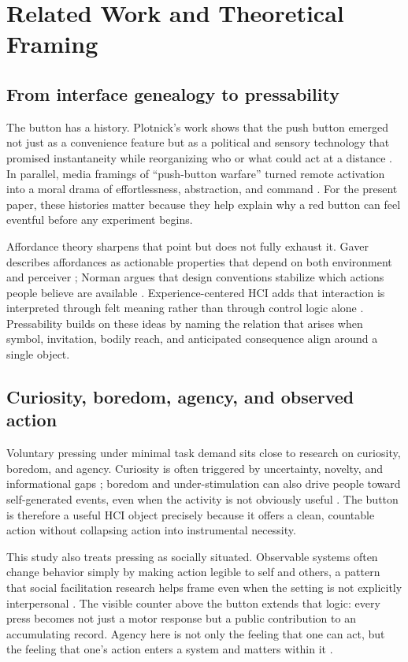 \section{Related Work and Theoretical Framing}

\subsection{From interface genealogy to pressability}

The button has a history. Plotnick's work shows that the push button emerged not just as a convenience feature but as a political and sensory technology that promised instantaneity while reorganizing who or what could act at a distance \citep{Plotnick2018,PlotnickInterface2012}. In parallel, media framings of ``push-button warfare'' turned remote activation into a moral drama of effortlessness, abstraction, and command \citep{PlotnickWarfare2012}. For the present paper, these histories matter because they help explain why a red button can feel eventful before any experiment begins.

Affordance theory sharpens that point but does not fully exhaust it. Gaver describes affordances as actionable properties that depend on both environment and perceiver \citep{Gaver1991}; Norman argues that design conventions stabilize which actions people believe are available \citep{Norman1999}. Experience-centered HCI adds that interaction is interpreted through felt meaning rather than through control logic alone \citep{McCarthyWright2004}. Pressability builds on these ideas by naming the relation that arises when symbol, invitation, bodily reach, and anticipated consequence align around a single object.

\subsection{Curiosity, boredom, agency, and observed action}

Voluntary pressing under minimal task demand sits close to research on curiosity, boredom, and agency. Curiosity is often triggered by uncertainty, novelty, and informational gaps \citep{KiddHayden2015}; boredom and under-stimulation can also drive people toward self-generated events, even when the activity is not obviously useful \citep{Wilson2014}. The button is therefore a useful HCI object precisely because it offers a clean, countable action without collapsing action into instrumental necessity.

This study also treats pressing as socially situated. Observable systems often change behavior simply by making action legible to self and others, a pattern that social facilitation research helps frame even when the setting is not explicitly interpersonal \citep{HallHenningsen2008}. The visible counter above the button extends that logic: every press becomes not just a motor response but a public contribution to an accumulating record. Agency here is not only the feeling that one can act, but the feeling that one's action enters a system and matters within it \citep{HaggardChambon2012}.

